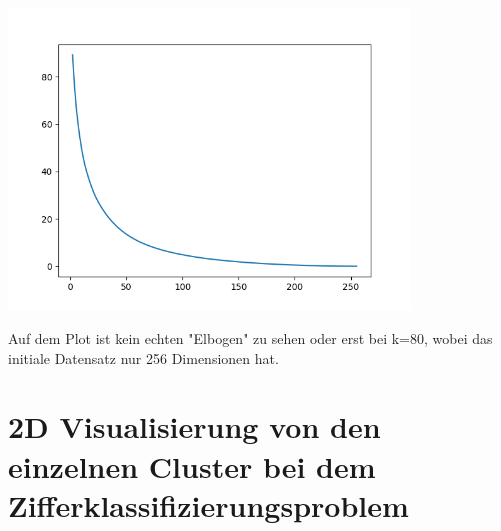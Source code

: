 \includegraphics[height=8cm]{./digits_k_variance.png}

Auf dem Plot ist kein echten "Elbogen" zu sehen oder erst bei k=80, wobei das initiale Datensatz
nur 256 Dimensionen hat.

\section*{2D Visualisierung von den einzelnen Cluster bei dem Zifferklassifizierungsproblem}



